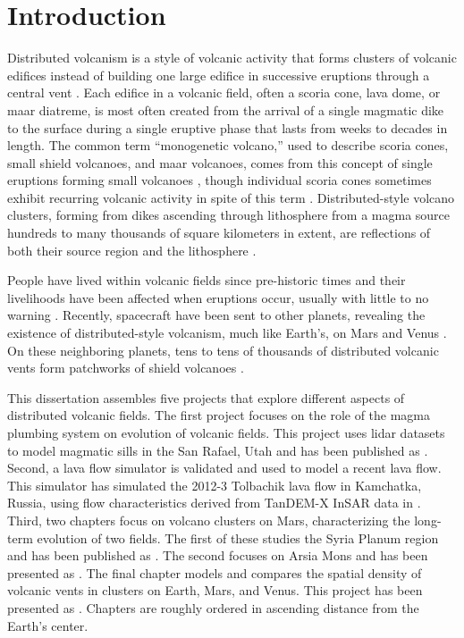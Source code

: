 \chapter[Introduction]{Introduction}

Distributed volcanism is a style of volcanic activity that forms clusters of volcanic edifices instead of building one large edifice in successive eruptions through a central vent \citep{valentine2000basaltic}. Each edifice in a volcanic field, often a scoria cone, lava dome, or maar diatreme, is most often created from the arrival of a single magmatic dike to the surface during a single eruptive phase that lasts from weeks to decades in length. The common term ``monogenetic volcano,'' used to describe scoria cones, small shield volcanoes, and maar volcanoes, comes from this concept of single eruptions forming small volcanoes \citep{greeley1977basaltic}, though individual scoria cones sometimes exhibit recurring volcanic activity in spite of this term \citep{hill1998cerro}. Distributed-style volcano clusters, forming from dikes ascending through lithosphere from a magma source hundreds to many thousands of square kilometers in extent, are reflections of both their source region and the lithosphere \citep{settle1979structure}.

People have lived within volcanic fields since pre-historic times and their livelihoods have been affected when eruptions occur, usually with little to no warning \citep{elson2007living}. Recently, spacecraft have been sent to other planets, revealing the existence of distributed-style volcanism, much like Earth's, on Mars \citep{carr1977some} and Venus \citep{head1992venus}. On these neighboring planets, tens to tens of thousands of distributed volcanic vents form patchworks of shield volcanoes \citep{richardson2013volcanic,miller2012shield}. 

This dissertation assembles five projects that explore different aspects of distributed volcanic fields. The first project focuses on the role of the magma plumbing system on evolution of volcanic fields. This project uses lidar datasets to model magmatic sills in the San Rafael, Utah and has been published as \citet{richardson2015sills}. Second, a lava flow simulator is validated and used to model a recent lava flow. This simulator has simulated the 2012-3 Tolbachik lava flow in Kamchatka, Russia, using flow characteristics derived from TanDEM-X InSAR data in \citet{kubanek2015lava}. Third, two chapters focus on volcano clusters on Mars, characterizing the long-term evolution of two fields. The first of these studies the Syria Planum region and has been published as \citet{richardson2013volcanic}. The second focuses on Arsia Mons and has been presented as \citet{richardson2015recurrence}. The final chapter models and compares the spatial density of volcanic vents in clusters on Earth, Mars, and Venus. This project has been presented as \citet{richardson2012comparison}. Chapters are roughly ordered in ascending distance from the Earth's center. 

